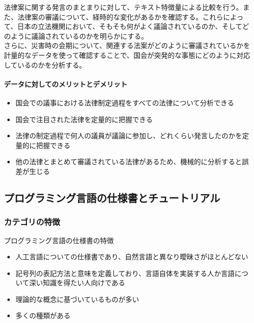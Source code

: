 法律案に関する発言のまとまりに対して、テキスト特徴量による比較を行う。また、法律案の審議について、経時的な変化があるかを確認する。これらによって、日本の立法機関において、そもそも何がよく議論されているのか、そしてどのように議論されているのかを明らかにする。\\
さらに、災害時の会期について、関連する法案がどのように審議されているかを計量的なデータを使って確認することで、国会が突発的な事態にどのように対応しているのかを分析する。

\hypertarget{ux30c7ux30fcux30bfux306bux5bfeux3057ux3066ux306eux30e1ux30eaux30c3ux30c8ux3068ux30c7ux30e1ux30eaux30c3ux30c8}{%
\paragraph{データに対してのメリットとデメリット}\label{ux30c7ux30fcux30bfux306bux5bfeux3057ux3066ux306eux30e1ux30eaux30c3ux30c8ux3068ux30c7ux30e1ux30eaux30c3ux30c8}}

\begin{itemize}
\tightlist
\item
  国会での議事における法律制定過程をすべての法律について分析できる
\item
  国会で注目された法律を定量的に把握できる
\item
  法律の制定過程で何人の議員が議論に参加し、どれくらい発言したのかを定量的に把握できる
\item
  他の法律とまとめて審議されている法律があるため、機械的に分析すると誤差が生じる
\end{itemize}

\hypertarget{ux30d7ux30edux30b0ux30e9ux30dfux30f3ux30b0ux8a00ux8a9eux306eux4ed5ux69d8ux66f8ux3068ux30c1ux30e5ux30fcux30c8ux30eaux30a2ux30eb}{%
\subsection{プログラミング言語の仕様書とチュートリアル}\label{ux30d7ux30edux30b0ux30e9ux30dfux30f3ux30b0ux8a00ux8a9eux306eux4ed5ux69d8ux66f8ux3068ux30c1ux30e5ux30fcux30c8ux30eaux30a2ux30eb}}

\hypertarget{ux30abux30c6ux30b4ux30eaux306eux7279ux5fb4-1}{%
\subsubsection{カテゴリの特徴}\label{ux30abux30c6ux30b4ux30eaux306eux7279ux5fb4-1}}

プログラミング言語の仕様書の特徴

\begin{itemize}
\tightlist
\item
  人工言語についての仕様書であり、自然言語と異なり曖昧さがほとんどない
\item
  記号列の表記方法と意味を定義しており、言語自体を実装する人か言語について深い知識を得たい人向けである
\item
  理論的な概念に基づいているものが多い
\item
  多くの種類がある
\end{itemize}

